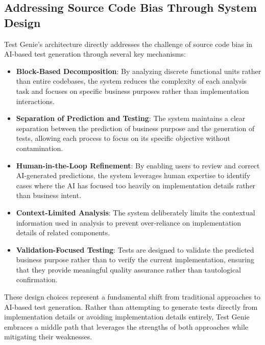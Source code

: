\subsection{Addressing Source Code Bias Through System Design}

\hspace{0.5cm}Test Genie's architecture directly addresses the challenge of source code bias in AI-based test generation through several key mechanisms:

\begin{itemize}
    \item \textbf{Block-Based Decomposition}: By analyzing discrete functional units rather than entire codebases, the system reduces the complexity of each analysis task and focuses on specific business purposes rather than implementation interactions.
    
    \item \textbf{Separation of Prediction and Testing}: The system maintains a clear separation between the prediction of business purpose and the generation of tests, allowing each process to focus on its specific objective without contamination.
    
    \item \textbf{Human-in-the-Loop Refinement}: By enabling users to review and correct AI-generated predictions, the system leverages human expertise to identify cases where the AI has focused too heavily on implementation details rather than business intent.
    
    \item \textbf{Context-Limited Analysis}: The system deliberately limits the contextual information used in analysis to prevent over-reliance on implementation details of related components.
    
    \item \textbf{Validation-Focused Testing}: Tests are designed to validate the predicted business purpose rather than to verify the current implementation, ensuring that they provide meaningful quality assurance rather than tautological confirmation.
\end{itemize}

\hspace{0.5cm}These design choices represent a fundamental shift from traditional approaches to AI-based test generation. Rather than attempting to generate tests directly from implementation details or avoiding implementation details entirely, Test Genie embraces a middle path that leverages the strengths of both approaches while mitigating their weaknesses.

